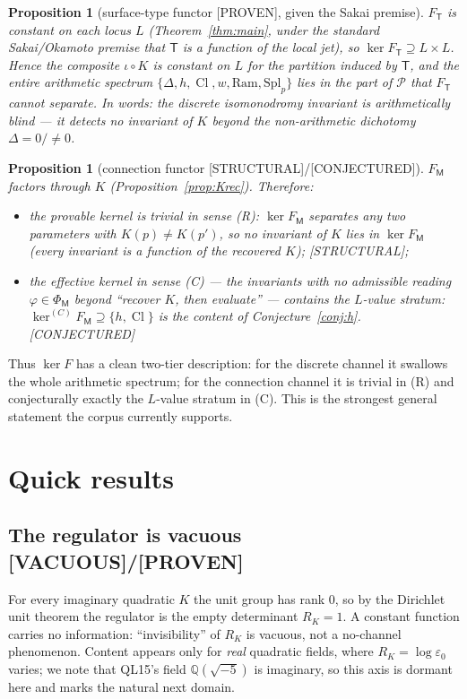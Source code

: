 \documentclass[11pt]{article}
\newtheorem{proposition}[theorem]{Proposition}
\theoremstyle{definition}
\newcommand{\Q}{\mathbb{Q}}
\newcommand{\Cl}{\operatorname{Cl}}
\newcommand{\Tch}{\mathsf{T}}
\newcommand{\Mch}{\mathsf{M}}
\newcommand{\PROVEN}{\textsf{[PROVEN]}}
\newcommand{\STRUCTURAL}{\textsf{[STRUCTURAL]}}
\newcommand{\CONJ}{\textsf{[CONJECTURED]}}
\newcommand{\VAC}{\textsf{[VACUOUS]}}
\begin{document}
\begin{proposition}[surface-type functor \PROVEN, given the Sakai premise]\label{prop:kerT}
$F_{\Tch}$ is constant on each locus $L$ (Theorem~\ref{thm:main}, under the standard
Sakai/Okamoto premise that $\Tch$ is a function of the local jet), so
$\ker F_{\Tch}\supseteq L\times L$.
Hence the composite $\iota\circ K$ is constant on $L$ for the partition induced by
$\Tch$, and the entire arithmetic spectrum
$\{\Delta,h,\Cl,w,\mathrm{Ram},\mathrm{Spl}_p\}$ lies in the part of $\mathcal P$ that
$F_{\Tch}$ cannot separate. In words: \emph{the discrete isomonodromy invariant is
arithmetically blind} --- it detects no invariant of $K$ beyond the non-arithmetic
dichotomy $\Delta=0/\!\neq\!0$.
\end{proposition}

\begin{proposition}[connection functor \STRUCTURAL/\CONJ]\label{prop:kerM}
$F_{\Mch}$ factors through $K$ (Proposition~\ref{prop:Krec}). Therefore:
\begin{itemize}[leftmargin=2em]
\item the \emph{provable} kernel is trivial in sense (R): $\ker F_{\Mch}$ separates any
two parameters with $K(p)\neq K(p')$, so no invariant of $K$ lies in $\ker F_{\Mch}$
(every invariant is a function of the recovered $K$); \STRUCTURAL;
\item the \emph{effective} kernel in sense (C) --- the invariants with no admissible
reading $\varphi\in\Phi_\Mch$ beyond ``recover $K$, then evaluate'' --- contains the
$L$-value stratum: $\ker^{(C)}F_{\Mch}\supseteq\{h,\Cl\}$ is the content of
Conjecture~\ref{conj:h}. \CONJ
\end{itemize}
\end{proposition}

Thus $\ker F$ has a clean two-tier description: for the discrete channel it swallows
the whole arithmetic spectrum; for the connection channel it is trivial in (R) and
conjecturally exactly the $L$-value stratum in (C). This is the strongest general
statement the corpus currently supports.

\section{Quick results}\label{sec:quick}

\subsection{The regulator is vacuous \VAC/\PROVEN}
For every imaginary quadratic $K$ the unit group has rank $0$, so by the Dirichlet
unit theorem the regulator is the empty determinant $R_K=1$. A constant function
carries no information: ``invisibility'' of $R_K$ is vacuous, not a no-channel
phenomenon. Content appears only for \emph{real} quadratic fields, where
$R_K=\log\varepsilon_0$ varies; we note that QL15's field $\Q(\sqrt{-5})$ is
imaginary, so this axis is dormant here and marks the natural next domain.
\end{document}
